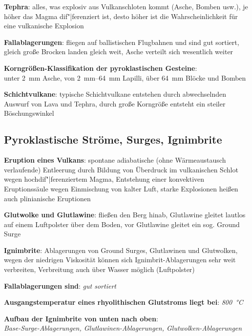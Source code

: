 \textbf{Tephra}:
alles, was explosiv aus Vulkanschloten kommt (Asche, Bomben usw.),
je höher das Magma dif"|ferenziert ist, desto höher ist die Wahrscheinlichkeit für eine
vulkanische Explosion

\textbf{Fallablagerungen}:
fliegen auf ballistischen Flugbahnen und sind gut sortiert,
gleich große Brocken landen gleich weit,
Asche verteilt sich wesentlich weiter

\textbf{Korngrößen-Klassifikation der pyroklastischen Gesteine}:\\
unter \SI{2}{\milli\meter} Asche,
von \SIrange{2}{64}{\milli\meter} Lapilli,
über \SI{64}{\milli\meter} Blöcke und Bomben

\textbf{Schichtvulkane}:
typische Schichtvulkane entstehen durch abwechselnden Auswurf von Lava und Tephra,
durch große Korngröße entsteht ein steiler Böschungswinkel

\pagebreak

\subsection{%
    Pyroklastische Ströme, Surges, Ignimbrite%
}

\textbf{Eruption eines Vulkans}:
spontane adiabatische (ohne Wärmeaustausch verlaufende) Entleerung durch
Bildung von Überdruck im vulkanischen Schlot wegen hochdif"|ferenziertem Magma,
Entstehung einer konvektiven Eruptionssäule wegen Einmischung von kalter Luft,
starke Explosionen heißen auch plinianische Eruptionen

\textbf{Glutwolke und Glutlawine}:
fließen den Berg hinab,
Glutlawine gleitet lautlos auf einem Luftpolster über dem Boden,
vor Glutlawine gleitet ein sog. Ground Surge

\textbf{Ignimbrite}:
Ablagerungen von Ground Surges, Glutlawinen und Glutwolken,
wegen der niedrigen Viskosität können sich Ignimbrit-Ablagerungen sehr weit verbreiten,
Verbreitung auch über Wasser möglich (Luftpolster)

\begin{wichtig}
    \item
    \textbf{Fallablagerungen sind}:
    \emph{gut sortiert}
    
    \item
    \textbf{Ausgangstemperatur eines rhyolithischen Glutstroms liegt bei}:
    \emph{\SI[math-rm=\mathit,text-rm=\itshape]{800}{\celsius}}
    
    \item
    \textbf{Aufbau der Ignimbrite von unten nach oben}:\\
    \emph{Base-Surge-Ablagerungen, Glutlawinen-Ablagerungen, Glutwolken-Ablagerungen}
\end{wichtig}


